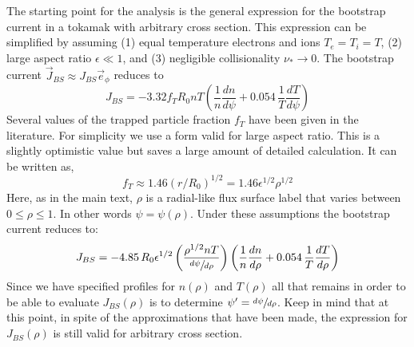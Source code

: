 The starting point for the analysis is the general expression for the bootstrap current in a tokamak with arbitrary cross section.\cite{wesson} This expression can be simplified by assuming (1) equal temperature electrons and ions $T_e = T_i = T$, (2) large aspect ratio $\epsilon \ll 1$, and (3) negligible collisionality $\nu_* \rightarrow 0$. The bootstrap current $\vec J_{BS} \approx J_{BS} \vec e_\phi$ reduces to
\begin{equation}
	J_{BS} = -3.32 f_T R_0 n T \left( \frac{1}{n} \frac{dn}{d\psi} + 0.054 \, \frac{1}{T} \frac{dT}{d\psi} \right)
\end{equation}
Several values of the trapped particle fraction $f_T$ have been given in the literature.\cite{kessel_bootstrap} For simplicity we use a form valid for large aspect ratio. This is a slightly optimistic value but saves a large amount of detailed calculation. It can be written as,
\begin{equation}
	f_T \approx 1.46 ( r / R_0 )^{1/2} = 1.46 \epsilon^{1/2} \rho^{1/2}
\end{equation}
Here, as in the main text, $\rho$ is a radial-like flux surface label that varies between $0 \le \rho \le 1 $. In other words $\psi = \psi(\rho)$. Under these assumptions the bootstrap current reduces to:
\begin{equation}
	\label{eq:bs_start}
	J_{BS} = -4.85 \, R_0 \epsilon^{1/2} \left( \frac{ \rho^{1/2} n T }{ \sfrac{d\psi}{d\rho}} \right) \left( \frac{1}{n} \frac{dn}{d\rho} + 0.054 \, \frac{1}{T} \frac{dT}{d\rho} \right)
\end{equation}
Since we have specified profiles for $n(\rho)$ and $T(\rho)$ all that remains in order to be able to evaluate $J_{BS}(\rho)$ is to determine $\psi' = \sfrac{d\psi}{d\rho}$. Keep in mind that at this point, in spite of the approximations that have been made, the expression for $J_{BS}(\rho)$ is still valid for arbitrary cross section.

